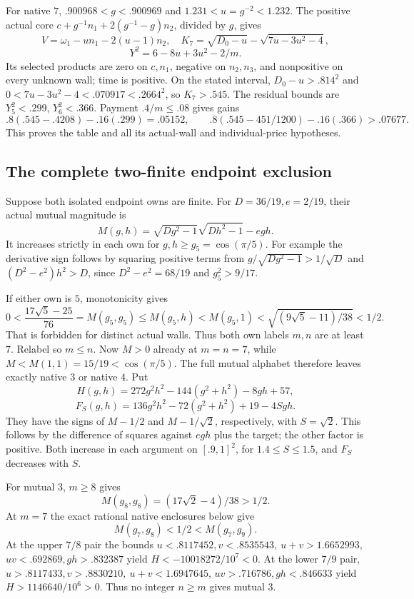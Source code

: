 \documentclass[11pt]{article}
\theoremstyle{definition}
\theoremstyle{remark}
\begin{document}
For native \(7\),
\(.900968<g<.900969\) and \(1.231<u=g^{-2}<1.232\).
The positive actual core
\(c+g^{-1}n_1+2(g^{-1}-g)n_2\), divided by \(g\),
gives
\[
 V=\omega_1-un_1-2(u-1)n_2,\quad
 K_7=\sqrt{D_0-u}-\sqrt{7u-3u^2-4},
\]
\[
 Y^2=6-8u+3u^2-2/m.
\]
Its selected products are zero on \(c,n_1\),
negative on \(n_2,n_3\), and nonpositive on
every unknown wall; time is positive.
On the stated interval,
\(D_0-u>.814^2\) and
\(0<7u-3u^2-4<.070917<.2664^2\), so \(K_7>.545\).
The residual bounds are \(Y_5^2<.299\),
\(Y_6^2<.366\).
Payment \(.4/m\leq.08\) gives gains
\[
 .8(.545-.4208)-.16(.299)=.05152,\qquad
 .8(.545-451/1200)-.16(.366)>.07677.
\]
This proves the table and all its actual-wall
and individual-price hypotheses.
\subsection{The complete two-finite endpoint exclusion}
\label{app:A18finitepair}
Suppose both isolated endpoint owns are finite.
For \(D=36/19,e=2/19\), their actual mutual
magnitude is
\[
 M(g,h)=\sqrt{Dg^2-1}\sqrt{Dh^2-1}-egh.
\]
It increases strictly in each own for
\(g,h\geq g_5=\cos(\pi/5)\).
For example the derivative sign follows by
squaring positive terms from
\(g/\sqrt{Dg^2-1}>1/\sqrt D\) and
\((D^2-e^2)h^2>D\), since
\(D^2-e^2=68/19\) and \(g_5^2>9/17\).

If either own is \(5\), monotonicity gives
\[
 0<\frac{17\sqrt5-25}{76}=M(g_5,g_5)
 \leq M(g_5,h)<M(g_5,1)
 <\sqrt{(9\sqrt5-11)/38}<1/2.
\]
That is forbidden for distinct actual walls.
Thus both own labels \(m,n\) are at least \(7\).
Relabel so \(m\leq n\). Now \(M>0\) already
at \(m=n=7\), while
\(M<M(1,1)=15/19<\cos(\pi/5)\).
The full mutual alphabet therefore leaves
exactly native \(3\) or native \(4\).
Put
\[
 H(g,h)=272g^2h^2-144(g^2+h^2)-8gh+57,
\]
\[
 F_S(g,h)=136g^2h^2-72(g^2+h^2)+19-4Sgh.
\]
They have the signs of \(M-1/2\) and
\(M-1/\sqrt2\), respectively, with
\(S=\sqrt2\). This follows by the
difference of squares against \(egh\)
plus the target; the other factor is
positive. Both increase in each argument
on \([.9,1]^2\), for \(1.4\leq S\leq1.5\),
and \(F_S\) decreases with \(S\).

For mutual \(3\), \(m\geq8\) gives
\[
 M(g_8,g_8)=(17\sqrt2-4)/38>1/2.
\]
At \(m=7\) the exact rational native
enclosures below give
\[
 M(g_7,g_8)<1/2<M(g_7,g_9).
\]
At the upper \(7/8\) pair the bounds
\(u<.8117452,v<.8535543,\ u+v>1.6652993\),
\(uv<.692869,gh>.832387\) yield
\(H<-10018272/10^7<0\).
At the lower \(7/9\) pair,
\(u>.8117433,v>.8830210,\ u+v<1.6947645\),
\(uv>.716786,gh<.846633\) yield
\(H>1146640/10^6>0\).
Thus no integer \(n\geq m\) gives mutual \(3\).
\end{document}
